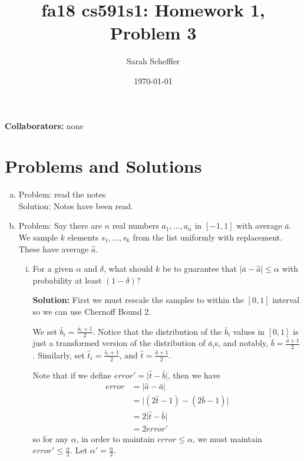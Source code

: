 \documentclass{article}
\title{fa18 cs591s1: Homework 1, Problem 3}
\author{Sarah Scheffler}
\date{\today}
\newcommand{\trueavg}{\bar{b}}
\newcommand{\sampavg}{\hat{t}}
\begin{document}
\maketitle
\textbf{Collaborators: } none

\section{Problems and Solutions}
\begin{enumerate}[(a)]
    \item Problem: read the notes \\
        Solution: Notes have been read.
    \item Problem: Say there are $n$ real numbers $a_1, \ldots, a_n$ in $[-1,1]$ with average $\bar{a}$.  We sample $k$
        elements $s_1, \ldots, s_k$ from the list uniformly with replacement.  These have average $\hat{a}$.  
        \begin{enumerate}[(i)]
            \item For a given $\alpha$ and $\delta$, what should $k$ be to guarantee that $\vert \bar{a} - \hat{a} \vert \le \alpha$
                with probability at least $(1-\delta)$? 

                \textbf{Solution:} First we must rescale the samples to within the $[0,1]$ interval so we can use Chernoff Bound 2.

                We set $\trueavg_i = \frac{\bar{a}_i + 1}{2}$.  Notice that the distribution of the $\trueavg_i$ values in
                $[0,1]$ is just a transformed version of the distribution of $\bar{a}_i$s, and notably, $\trueavg =
                \frac{\bar{a}+1}{2}$.  Similarly, set $\sampavg_i = \frac{\hat{s}_i + 1}{2}$, and $\sampavg = \frac{\hat{a}
                + 1}{2}$.

                Note that if we define $error' = \vert \sampavg - \trueavg \vert$, then we have
                \begin{align*}
                    error &= \vert \hat{a} - \bar{a} \vert \\
                        &= \vert (2\sampavg - 1) - (2\trueavg - 1) \vert \\
                        &= 2\vert \sampavg - \trueavg \vert \\
                        &= 2error'
                \end{align*}
                so for any $\alpha$, in order to maintain $error \le \alpha$, we must maintain $error' \le
                \frac{\alpha}{2}$.  Let $\alpha' = \frac{\alpha}{2}$.


\end{enumerate}
\end{enumerate}
\end{document}
